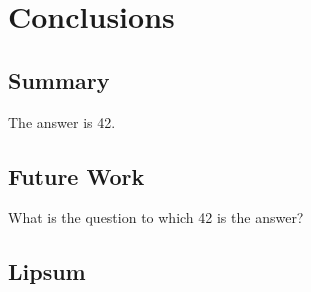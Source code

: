\chapter{Conclusions}

\section{Summary}

The answer is 42.

\section{Future Work}

What is the question to which 42 is the answer?

\section{Lipsum}

\lipsum
\lipsum
\lipsum
\lipsum
